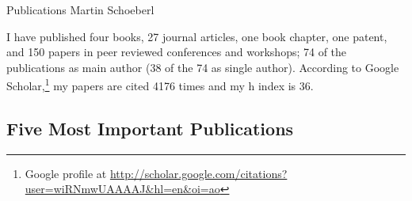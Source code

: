 \documentclass[%
    a4paper,
    11pt, %
    headinclude, footexclude,
    notitlepage,
    headsepline,
    pointlessnumbers,
    ]{scrartcl}
\begin{document}
\pagestyle{scrheadings}

\begin{center}
\vspace{3cm}
{\huge Publications Martin Schoeberl}\\
\bigskip
\bigskip
\end{center}

I have published four books, 27 journal articles, one book chapter, one patent, and 150
papers in peer reviewed conferences and workshops; 74 of the publications
as main author (38 of the 74 as single author).
According to Google Scholar,\footnote{Google profile at
\url{http://scholar.google.com/citations?user=wiRNmwUAAAAJ&hl=en&oi=ao}
}
my papers are cited 4176 times and my h index is 36.

\subsection*{Five Most Important Publications}
\end{document}
